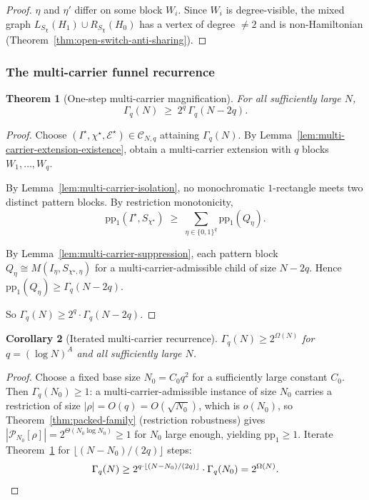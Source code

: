 \documentclass[11pt]{article}
\newtheorem{theorem}{Theorem}[section]
\newtheorem{corollary}[theorem]{Corollary}
\begin{document}
\begin{proof}
$\eta$ and $\eta'$ differ on some block $W_i$.  Since $W_i$ is
degree-visible, the mixed graph $L_{S_\chi}(H_1) \cup R_{S_\chi}(H_0)$
has a vertex of degree $\neq 2$ and is non-Hamiltonian
(Theorem~\ref{thm:open-switch-anti-sharing}).
\end{proof}

\subsubsection*{The multi-carrier funnel recurrence}

\begin{theorem}[One-step multi-carrier magnification]
\label{thm:multi-carrier-magnification}
For all sufficiently large $N$,
\[
\Gamma_q(N) \;\ge\; 2^q\,\Gamma_q(N - 2q).
\]
\end{theorem}

\begin{proof}
Choose $(I^\star, \chi^\star, \mathcal{E}^\star) \in \mathcal{C}_{N,q}$
attaining $\Gamma_q(N)$.  By
Lemma~\ref{lem:multi-carrier-extension-existence}, obtain a multi-carrier
extension with $q$ blocks $W_1, \ldots, W_q$.

By Lemma~\ref{lem:multi-carrier-isolation}, no monochromatic $1$-rectangle
meets two distinct pattern blocks.  By restriction monotonicity,
\[
\mathrm{pp}_1(I^\star, S_{\chi^\star})
\;\ge\; \sum_{\eta \in \{0,1\}^q} \mathrm{pp}_1(Q_\eta).
\]

By Lemma~\ref{lem:multi-carrier-suppression}, each pattern block
$Q_\eta \cong M(I_\eta, S_{\chi^\star,\eta})$ for a
multi-carrier-admissible child of size $N - 2q$.  Hence
$\mathrm{pp}_1(Q_\eta) \ge \Gamma_q(N - 2q)$.

So $\Gamma_q(N) \ge 2^q \cdot \Gamma_q(N - 2q)$.
\end{proof}

\begin{corollary}[Iterated multi-carrier recurrence]
\label{cor:multi-carrier-recurrence}
$\Gamma_q(N) \ge 2^{\Omega(N)}$ for $q = (\log N)^A$ and all
sufficiently large $N$.
\end{corollary}

\begin{proof}
Choose a fixed base size $N_0 = C_0 q^2$ for a sufficiently large
constant $C_0$.  Then $\Gamma_q(N_0) \ge 1$: a multi-carrier-admissible
instance of size $N_0$ carries a restriction of size
$|\rho| = O(q) = O(\sqrt{N_0})$, which is $o(N_0)$, so
Theorem~\ref{thm:packed-family} (restriction robustness) gives
$|\mathcal{P}_{N_0}[\rho]| = 2^{\Theta(N_0 \log N_0)} \ge 1$ for
$N_0$ large enough, yielding $\mathrm{pp}_1 \ge 1$.
Iterate Theorem~\ref{thm:multi-carrier-magnification} for
$\lfloor(N - N_0)/(2q)\rfloor$ steps:
\[
\Gamma_q(N) \ge 2^{q \cdot \lfloor(N-N_0)/(2q)\rfloor} \cdot \Gamma_q(N_0)
= 2^{\Omega(N)}.  \qedhere
\]
\end{proof}
\end{document}

